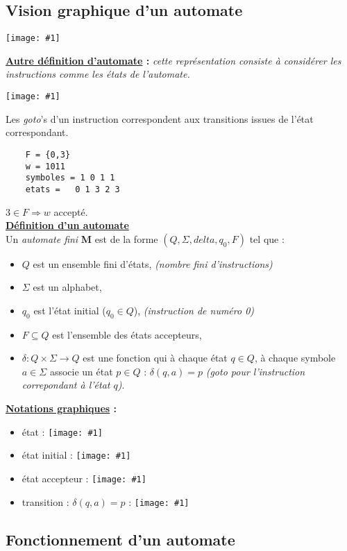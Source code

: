 \documentclass{article}
\newcommand{\titre}[1]{\textcolor{title}{#1}}
\newcommand{\tssect}[1]{\titre{\subsection{#1}}}
\newcommand{\term}[1]{\textit{\textcolor{maintitle}{#1}}}
\newcommand{\imageR}[2]{\texttt{[image: \#1]}}
\newcommand{\imgR}[2]{\begin{center}\texttt{[image: \#1]}\end{center}}
\begin{document}
\begin{sffamily}
\newpage

\tssect{Vision graphique d'un automate}

\imgR{img3.png}{200}

\noindent\textbf{\underline{Autre définition d'automate} :} \textit{cette représentation consiste à considérer les 
instructions comme les états de l'automate.}

\imgR{img4.png}{125}

\noindent Les \term{goto}'s d'un instruction correspondent aux transitions issues de l'état correspondant. \\

\begin{verbatim}
	F = {0,3}
	w = 1011
	symboles = 1 0 1 1
	etats =   0 1 3 2 3 
\end{verbatim}
$3 \in F \Rightarrow w$ accepté.\\

\noindent\textbf{\underline{Définition d'un automate}} \\
Un \term{automate fini} \textbf{M} est de la forme $(Q,\Sigma,delta,q_0,F)$ tel que :
\begin{itemize}
\item $Q$ est un ensemble fini d'états, \textit{(nombre fini d'instructions)}
\item $\Sigma$ est un alphabet,
\item $q_0$ est l'état initial ($q_0 \in Q$), \textit{(instruction de numéro 0)}
\item $F \subseteq Q$ est l'ensemble des états accepteurs,
\item $\delta : Q \times \Sigma \to Q$ est une fonction qui à chaque état $q\in Q$, à chaque symbole $a \in \Sigma$ 
associe un état $p\in Q$ : $\delta(q,a) = p$ \textit{(goto pour l'instruction correpondant à l'état $q$)}. \\
\end{itemize}

\noindent\textbf{\underline{Notations graphiques} :} 
\begin{itemize}
\item état : \imageR{img5.png}{15}
\item état initial : \imageR{img6.png}{20}
\item état accepteur : \imageR{img7.png}{15}
\item transition : $\delta(q,a) = p$ : \imageR{img8.png}{45}
\end{itemize}

\newpage

\tssect{Fonctionnement d'un automate}


\end{sffamily}
\end{document}
